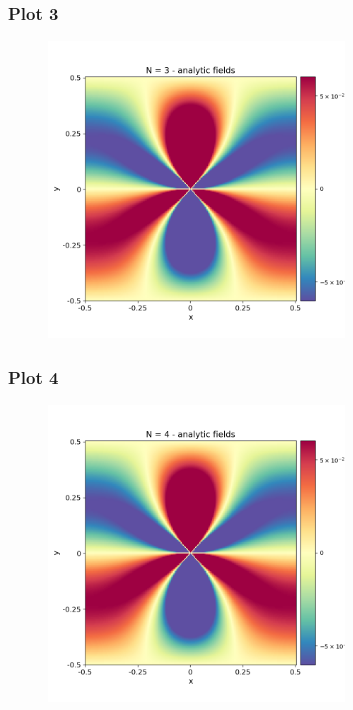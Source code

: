 \documentclass{beamer}
\begin{document}
\begin{frame}
    \frametitle{Plot 3}
    \begin{figure}[H]
        \centering
        \includegraphics[width=0.7\textwidth]{../stress_field_03.png}
    \end{figure}
\end{frame}

\begin{frame}
    \frametitle{Plot 4}
    \begin{figure}[H]
        \centering
        \includegraphics[width=0.7\textwidth]{../stress_field_04.png}
    \end{figure}
\end{frame}
\end{document}
